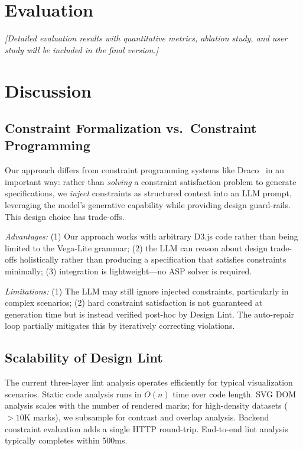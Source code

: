 \documentclass[journal]{vgtc}
\begin{document}
\section{Evaluation}

\textit{[Detailed evaluation results with quantitative metrics, ablation study, and user study will be included in the final version.]}

\section{Discussion}

\subsection{Constraint Formalization vs.\ Constraint Programming}

Our approach differs from constraint programming systems like Draco~\cite{moritz2018formalizing} in an important way: rather than \textit{solving} a constraint satisfaction problem to generate specifications, we \textit{inject} constraints as structured context into an LLM prompt, leveraging the model's generative capability while providing design guard-rails.
This design choice has trade-offs.

\textit{Advantages:} (1) Our approach works with arbitrary D3.js code rather than being limited to the Vega-Lite grammar; (2) the LLM can reason about design trade-offs holistically rather than producing a specification that satisfies constraints minimally; (3) integration is lightweight—no ASP solver is required.

\textit{Limitations:} (1) The LLM may still ignore injected constraints, particularly in complex scenarios; (2) hard constraint satisfaction is not guaranteed at generation time but is instead verified post-hoc by Design Lint.
The auto-repair loop partially mitigates this by iteratively correcting violations.

\subsection{Scalability of Design Lint}

The current three-layer lint analysis operates efficiently for typical visualization scenarios.
Static code analysis runs in $O(n)$ time over code length.
SVG DOM analysis scales with the number of rendered marks; for high-density datasets ($>10$K marks), we subsample for contrast and overlap analysis.
Backend constraint evaluation adds a single HTTP round-trip.
End-to-end lint analysis typically completes within 500ms.
\end{document}
